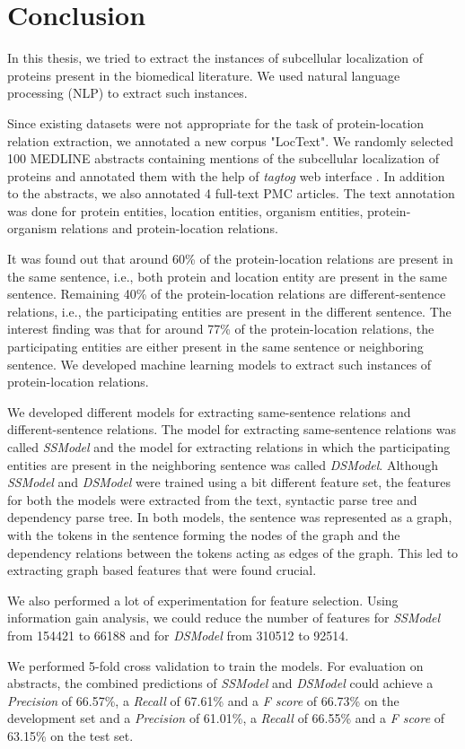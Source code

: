 \chapter{Conclusion}\label{chapter:conclusion}

In this thesis, we tried to extract the instances of subcellular localization of proteins present in the biomedical literature. We used natural language processing (NLP) to extract such instances.

Since existing datasets were not appropriate for the task of protein-location relation extraction, we annotated a new corpus "LocText". We randomly selected 100 MEDLINE \cite{medline} abstracts containing mentions of the subcellular localization of proteins and annotated them with the help of \textit{tagtog} web interface \cite{cejuela2014tagtog}. In addition to the abstracts, we also annotated 4 full-text PMC \cite{pmc} articles. The text annotation was done for protein entities, location entities, organism entities, protein-organism relations and protein-location relations.

It was found out that around 60\% of the protein-location relations are present in the same sentence, i.e., both protein and location entity are present in the same sentence. Remaining 40\% of the protein-location relations are different-sentence relations, i.e., the participating entities are present in the different sentence. The interest finding was that for around 77\% of the protein-location relations, the participating entities are either present in the same sentence or neighboring sentence. We developed machine learning models to extract such instances of protein-location relations.

We developed different models for extracting same-sentence relations and different-sentence relations. The model for extracting same-sentence relations was called \textit{SSModel} and the model for extracting relations in which the participating entities are present in the neighboring sentence was called \textit{DSModel}. Although \textit{SSModel} and \textit{DSModel} were trained using a bit different feature set, the features for both the models were extracted from the text, syntactic parse tree and dependency parse tree. In both models, the sentence was represented as a graph, with the tokens in the sentence forming the nodes of the graph and the dependency relations between the tokens acting as edges of the graph. This led to extracting graph based features that were found crucial.

We also performed a lot of experimentation for feature selection. Using information gain analysis, we could reduce the number of features for \textit{SSModel} from 154421 to 66188 and for \textit{DSModel} from 310512 to 92514.

We performed 5-fold cross validation to train the models. For evaluation on abstracts, the combined predictions of \textit{SSModel} and \textit{DSModel} could achieve a \textit{Precision} of 66.57\%, a \textit{Recall} of 67.61\% and a \textit{F score} of 66.73\% on the development set and a \textit{Precision} of 61.01\%, a \textit{Recall} of 66.55\% and a \textit{F score} of 63.15\% on the test set.
